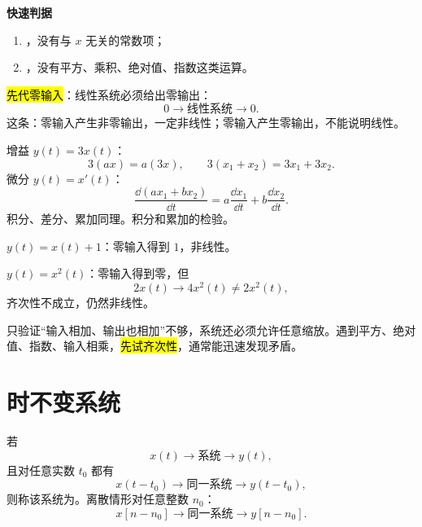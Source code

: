 \noindent\textbf{快速判据}
\begin{enumerate}
  \item {}，没有与 $x$ 无关的常数项；
  \item {}，没有平方、乘积、绝对值、指数这类运算。
\end{enumerate}
\hl{先代零输入}：线性系统必须给出零输出：
\begin{equation}
  0\longrightarrow\boxed{\text{线性系统}}\longrightarrow0.
  \label{eq:zero-input-zero-output}
\end{equation}
这条：零输入产生非零输出，一定非线性；零输入产生零输出，不能说明线性。


\begin{example}[增益、微分、积分、差分]
  增益 $y(t)=3x(t)$：
  \[
    3(ax)=a(3x),\qquad
    3(x_1+x_2)=3x_1+3x_2.
  \]
  微分 $y(t)=x'(t)$：
  \[
    \frac{\dd(ax_1+bx_2)}{\dd t}
    =a\frac{\dd x_1}{\dd t}+b\frac{\dd x_2}{\dd t}.
  \]
  积分、差分、累加同理。积分和累加的检验。
\end{example}

\begin{example}[常数偏置与平方]
  $y(t)=x(t)+1$：零输入得到 $1$，非线性。

  $y(t)=x^2(t)$：零输入得到零，但
  \[
    2x(t)\longrightarrow4x^2(t)\ne2x^2(t),
  \]
  齐次性不成立，仍然非线性。
\end{example}

只验证“输入相加、输出也相加”不够，系统还必须允许任意缩放。遇到平方、绝对值、指数、输入相乘，\hl{先试齐次性}，通常能迅速发现矛盾。

\section{时不变系统}
\label{sec:time-invariant-systems}

\begin{definition}[时不变系统]
  \label{def:time-invariant-system}
  若
  \[
    x(t)\longrightarrow\boxed{\text{系统}}\longrightarrow y(t),
  \]
  且对任意实数 $t_0$ 都有
  \begin{equation}
    x(t-t_0)\longrightarrow\boxed{\text{同一系统}}\longrightarrow y(t-t_0),
    \label{eq:ct-time-invariance}
  \end{equation}
  则称该系统为。离散情形对任意整数 $n_0$：
  \begin{equation}
    x[n-n_0]\longrightarrow\boxed{\text{同一系统}}\longrightarrow y[n-n_0].
    \label{eq:dt-time-invariance}
  \end{equation}
\end{definition}

